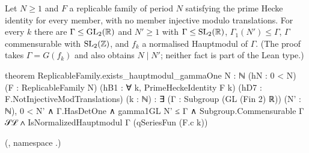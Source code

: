 \begin{theorem}\label{ch19:thm:gz}
Let $N\ge1$ and $F$ a replicable family of period $N$ satisfying the prime Hecke identity for every member, with no member injective modulo
translations.  For every $k$ there are $\Gamma\le\mathrm{GL}_2(\mathbb{R})$ and $N'\ge1$ with $\Gamma\le\mathrm{SL}_2(\mathbb{R})$, $\Gamma_1(N')\le\Gamma$, $\Gamma$ commensurable
with $\mathrm{SL}_2(\mathbb{Z})$, and $f_k$ a normalised Hauptmodul of $\Gamma$.  (The proof takes $\Gamma=G(f_k)$ and also obtains $N\mid N'$;
neither fact is part of the Lean type.)
\end{theorem}
\begin{leancode}
theorem ReplicableFamily.exists_hauptmodul_gammaOne {N : ℕ} (hN : 0 < N)
    (F : ReplicableFamily N) (hB1 : ∀ k, PrimeHeckeIdentity F k)
    (hD7 : F.NotInjectiveModTranslations) (k : ℕ) :
    ∃ (Γ : Subgroup (GL (Fin 2) ℝ)) (N' : ℕ), 0 < N' ∧ Γ.HasDetOne ∧ gamma1GL N' ≤ Γ ∧
      Subgroup.Commensurable Γ 𝒮ℒ ∧ IsNormalizedHauptmodul Γ (qSeriesFun (F.c k))
\end{leancode}
(, namespace .)
